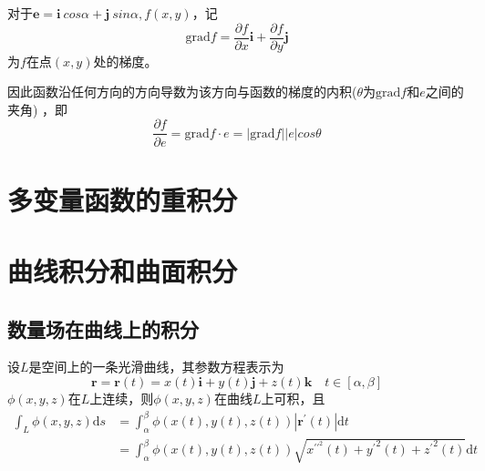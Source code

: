 \documentclass[lang=cn,10pt]{elegantbook}
\newcommand\bv[1]{\boldsymbol{#1}}
\begin{document}
\begin{definition}[梯度]
    对于$\bv{e} = \bv{i}~cos\alpha+\bv{j}~sin\alpha,f(x,y)$，记
    \begin{equation}
        \mathrm{grad}f=\frac{\partial f}{\partial x}\bv{i}+\frac{\partial f}{\partial y}\bv{j}
    \end{equation}
    为$f$在点$(x,y)$处的梯度。
\end{definition}

因此函数沿任何方向的方向导数为该方向与函数的梯度的内积($\theta$为$\mathrm{grad}f\text{和} e$之间的夹角)
，即
\begin{equation}
    \frac{\partial f}{\partial e} = \mathrm{grad}f\cdot e=|\mathrm{grad}f| |e|cos\theta
\end{equation}

\chapter{多变量函数的重积分}

\chapter{曲线积分和曲面积分}
\section{数量场在曲线上的积分}
\begin{theorem}
    设$L$是空间上的一条光滑曲线，其参数方程表示为
    \begin{equation}
        \bv{r}=\bv{r}(t)=x(t)\boldsymbol{i}+y(t)\boldsymbol{j}+z(t)\boldsymbol{k}\quad t\in[\alpha,\beta]
    \end{equation}
    $\phi(x,y,z)$在$L$上连续，则$\phi(x,y,z)$在曲线$L$上可积，且
    \begin{equation*}
        \begin{aligned}
            \int_{L}\phi(x,y,z)\mathrm{d}s
             & =\int_\alpha^\beta\phi(x(t),y(t),z(t))|\boldsymbol{r}^\prime(t)|\mathrm{d}t                                    \\
             & =\int_\alpha^\beta\phi(x(t),y(t),z(t))\sqrt{x^{\prime{'}^2}(t)+{y^{\prime}}^2(t)+{z^{\prime}}^2(t)}\mathrm{d}t
        \end{aligned}
    \end{equation*}
\end{theorem}
\end{document}
